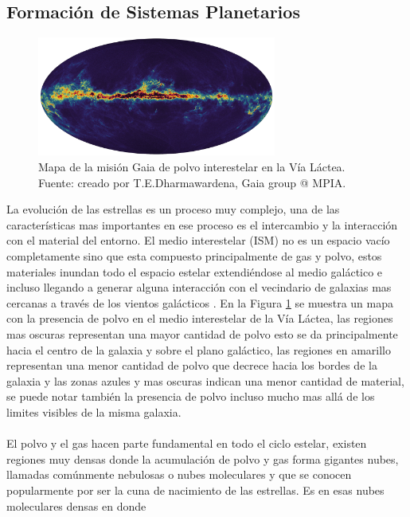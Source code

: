 \documentclass[12pt]{article}
\begin{document}
\subsection{Formación de Sistemas Planetarios}\label{sec:Sistemas solares}
\begin{figure}[H]
    \includegraphics[width=0.7\textwidth]{images/Gaia_map_of_interstellar_dust_in_the_Milky_Way.png}
    \centering
    \caption{Mapa de la misión Gaia de polvo interestelar en la Vía Láctea. 
    Fuente: creado por T.E.Dharmawardena, Gaia group @ MPIA.}
    \label{fig:mapa_gaia}
\end{figure}
La evolución de las estrellas es un proceso muy complejo, una de las características mas importantes 
en ese proceso es el intercambio y la interacción con el material del entorno. El medio interestelar (ISM) 
no es un espacio vacío completamente sino que esta compuesto principalmente de gas y polvo, estos 
materiales inundan todo el espacio estelar extendiéndose al medio galáctico e incluso llegando 
a generar alguna interacción con el vecindario de galaxias mas cercanas a través de los vientos galácticos
\parencite{annurev:galacticwinds}. En la Figura \ref{fig:mapa_gaia} se muestra un mapa con la presencia 
de polvo en 
el medio interestelar de la Vía Láctea, las regiones mas oscuras representan una mayor cantidad de polvo 
esto se da principalmente hacia el centro de la galaxia y sobre el plano galáctico, las regiones en 
amarillo representan una menor cantidad de polvo que decrece hacia los bordes de la galaxia y las zonas 
azules y mas oscuras indican una menor cantidad de material, se puede notar también la presencia de polvo 
incluso mucho mas allá de los limites visibles de la misma galaxia.\\
\\
El polvo y el gas hacen parte fundamental en todo el ciclo estelar, existen regiones muy densas donde 
la acumulación de polvo y gas forma gigantes nubes, llamadas comúnmente nebulosas o nubes moleculares y 
que se conocen 
popularmente por ser la cuna de nacimiento de las estrellas. Es en esas nubes moleculares densas en donde 
\end{document}
